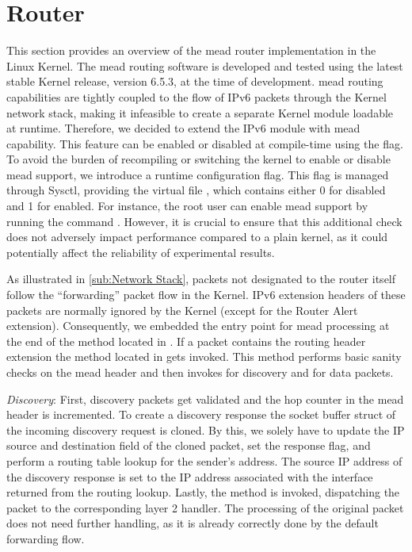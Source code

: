 \section{Router} %
\label{sec:Router}
This section provides an overview of the \gls{mead} router implementation in the
    Linux Kernel.
The \gls{mead} routing software is developed and tested using the latest stable
    Kernel release, version 6.5.3, at the time of development.
\gls{mead} routing capabilities are tightly coupled to the flow of IPv6 packets
    through the Kernel network stack, making it infeasible to create a separate
    Kernel module loadable at runtime.
Therefore, we decided to extend the IPv6 module with \gls{mead} capability.
This feature can be enabled or disabled at compile-time using the
     flag.
To avoid the burden of recompiling or switching the kernel to enable or disable
    \gls{mead} support, we introduce a runtime configuration flag.
This flag is managed through Sysctl, providing the virtual file
    , which contains either 0 for
    disabled and 1 for enabled.
For instance, the root user can enable \gls{mead} support by running the command
    .
However, it is crucial to ensure that this additional check does not adversely
    impact performance compared to a plain kernel, as it could potentially
    affect the reliability of experimental results.

As illustrated in \autoref{sub:Network Stack}, packets not designated to the
    router itself follow the ``forwarding'' packet flow in the Kernel.
IPv6 extension headers of these packets are normally ignored by the Kernel
    (except for the Router Alert extension).
Consequently, we embedded the entry point for \gls{mead} processing at the end of
    the  method located in
    .
If a packet contains the routing header extension the 
    method located in  gets invoked.
This method performs basic sanity checks on the \gls{mead} header and then
    invokes  for discovery and
     for data packets.

\textit{Discovery}: First, discovery packets get validated and the hop counter
    in the \gls{mead} header is incremented.
To create a discovery response the socket buffer struct of the incoming
    discovery request is cloned.
By this, we solely have to update the IP source and destination field of the
    cloned packet, set the response flag, and perform a routing table lookup
    for the sender's address.
The source IP address of the discovery response is set to the IP address
    associated with the interface returned from the routing lookup.
Lastly, the  method is invoked, dispatching the packet to
    the corresponding layer 2 handler.
The processing of the original packet does not need further handling, as it is
    already correctly done by the default forwarding flow.

